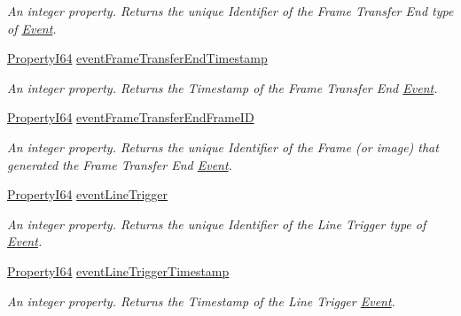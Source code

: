 \begin{DoxyCompactItemize}
\begin{DoxyCompactList}\small\item\em An integer property. Returns the unique Identifier of the Frame Transfer End type of \hyperlink{classmv_i_m_p_a_c_t_1_1acquire_1_1_event}{Event}. \end{DoxyCompactList}\item 
\hyperlink{group___common_interface_ga81749b2696755513663492664a18a893}{Property\+I64} \hyperlink{classmv_i_m_p_a_c_t_1_1acquire_1_1_gen_i_cam_1_1_event_control_a09d0258736c22952bb7f7d202e1ca17e}{event\+Frame\+Transfer\+End\+Timestamp}
\begin{DoxyCompactList}\small\item\em An integer property. Returns the Timestamp of the Frame Transfer End \hyperlink{classmv_i_m_p_a_c_t_1_1acquire_1_1_event}{Event}. \end{DoxyCompactList}\item 
\hyperlink{group___common_interface_ga81749b2696755513663492664a18a893}{Property\+I64} \hyperlink{classmv_i_m_p_a_c_t_1_1acquire_1_1_gen_i_cam_1_1_event_control_a84206a72c342b079f41a8ed34c608c84}{event\+Frame\+Transfer\+End\+Frame\+I\+D}
\begin{DoxyCompactList}\small\item\em An integer property. Returns the unique Identifier of the Frame (or image) that generated the Frame Transfer End \hyperlink{classmv_i_m_p_a_c_t_1_1acquire_1_1_event}{Event}. \end{DoxyCompactList}\item 
\hyperlink{group___common_interface_ga81749b2696755513663492664a18a893}{Property\+I64} \hyperlink{classmv_i_m_p_a_c_t_1_1acquire_1_1_gen_i_cam_1_1_event_control_a2756bf3c6e8999af797a204bf5f1603a}{event\+Line\+Trigger}
\begin{DoxyCompactList}\small\item\em An integer property. Returns the unique Identifier of the Line Trigger type of \hyperlink{classmv_i_m_p_a_c_t_1_1acquire_1_1_event}{Event}. \end{DoxyCompactList}\item 
\hyperlink{group___common_interface_ga81749b2696755513663492664a18a893}{Property\+I64} \hyperlink{classmv_i_m_p_a_c_t_1_1acquire_1_1_gen_i_cam_1_1_event_control_afd63d96889fbd4e5201bb15528bd9c90}{event\+Line\+Trigger\+Timestamp}
\begin{DoxyCompactList}\small\item\em An integer property. Returns the Timestamp of the Line Trigger \hyperlink{classmv_i_m_p_a_c_t_1_1acquire_1_1_event}{Event}. \end{DoxyCompactList}\item 

\end{DoxyCompactItemize}
